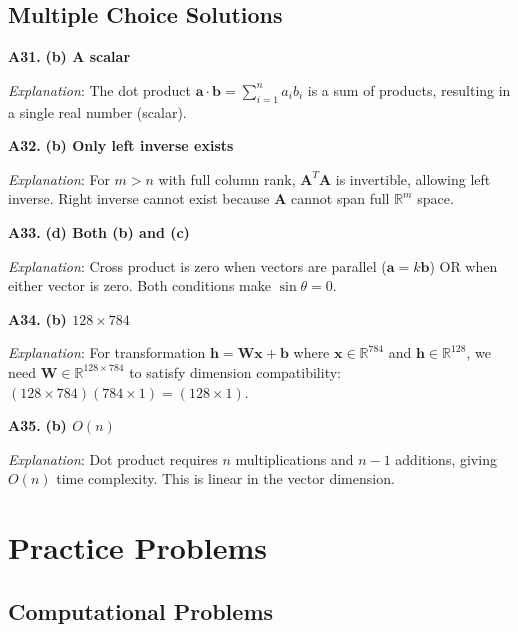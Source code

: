 \documentclass[12pt,a4paper]{article}
\theoremstyle{definition}
\begin{document}
\subsection{Multiple Choice Solutions}

\textbf{A31.} \textbf{(b) A scalar}

\textit{Explanation}: The dot product $\mathbf{a} \cdot \mathbf{b} = \sum_{i=1}^{n} a_i b_i$ is a sum of products, resulting in a single real number (scalar).

\textbf{A32.} \textbf{(b) Only left inverse exists}

\textit{Explanation}: For $m > n$ with full column rank, $\mathbf{A}^T\mathbf{A}$ is invertible, allowing left inverse. Right inverse cannot exist because $\mathbf{A}$ cannot span full $\mathbb{R}^m$ space.

\textbf{A33.} \textbf{(d) Both (b) and (c)}

\textit{Explanation}: Cross product is zero when vectors are parallel ($\mathbf{a} = k\mathbf{b}$) OR when either vector is zero. Both conditions make $\sin \theta = 0$.

\textbf{A34.} \textbf{(b) $128 \times 784$}

\textit{Explanation}: For transformation $\mathbf{h} = \mathbf{W}\mathbf{x} + \mathbf{b}$ where $\mathbf{x} \in \mathbb{R}^{784}$ and $\mathbf{h} \in \mathbb{R}^{128}$, we need $\mathbf{W} \in \mathbb{R}^{128 \times 784}$ to satisfy dimension compatibility: $(128 \times 784)(784 \times 1) = (128 \times 1)$.

\textbf{A35.} \textbf{(b) $O(n)$}

\textit{Explanation}: Dot product requires $n$ multiplications and $n-1$ additions, giving $O(n)$ time complexity. This is linear in the vector dimension.

\newpage

\section{Practice Problems}

\subsection{Computational Problems}
\end{document}

